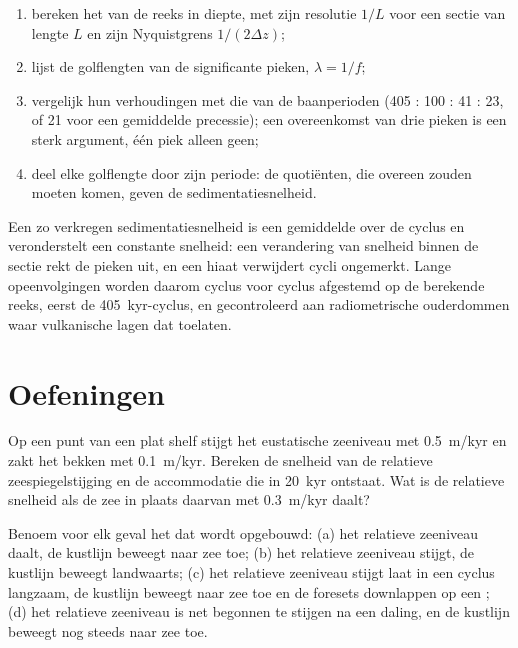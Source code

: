 \begin{method}\label{met:b3:sequence-stratigraphy:cycles}
\begin{enumerate}
\item bereken het  van de reeks in diepte, met zijn resolutie
  $1/L$ voor een sectie van lengte $L$ en zijn Nyquistgrens $1/(2\Delta z)$;
\item lijst de golflengten van de significante pieken, $\lambda = 1/f$;
\item vergelijk hun verhoudingen met die van de baanperioden (405 : 100 : 41
  : 23, of 21 voor een gemiddelde precessie); een overeenkomst van drie pieken is een sterk
  argument, één piek alleen geen;
\item deel elke golflengte door zijn periode: de quotiënten, die overeen zouden moeten komen,
  geven de sedimentatiesnelheid.
\end{enumerate}
\end{method}

Een zo verkregen sedimentatiesnelheid is een gemiddelde over de cyclus en
veronderstelt een constante snelheid: een verandering van snelheid binnen de sectie rekt de
pieken uit, en een hiaat verwijdert cycli ongemerkt. Lange opeenvolgingen worden daarom
cyclus voor cyclus afgestemd op de berekende reeks, eerst de \qty{405}{kyr}-cyclus,
en gecontroleerd aan radiometrische ouderdommen waar vulkanische lagen dat toelaten.

\section{Oefeningen}

\begin{exercise}[$\star$]\label{exo:b3:sequence-stratigraphy:1}
Op een punt van een plat shelf stijgt het eustatische zeeniveau met \qty{0.5}{m/kyr} en
zakt het bekken met \qty{0.1}{m/kyr}. Bereken de snelheid van de relatieve
zeespiegelstijging en de accommodatie die in \qty{20}{kyr} ontstaat. Wat is de relatieve
snelheid als de zee in plaats daarvan met \qty{0.3}{m/kyr} daalt?
\end{exercise}

\begin{exercise}[$\star$]\label{exo:b3:sequence-stratigraphy:2}
Benoem voor elk geval het  dat wordt opgebouwd: (a) het relatieve zeeniveau
daalt, de kustlijn beweegt naar zee toe; (b) het relatieve zeeniveau stijgt, de
kustlijn beweegt landwaarts; (c) het relatieve zeeniveau stijgt laat in een
cyclus langzaam, de kustlijn beweegt naar zee toe en de foresets downlappen op een
; (d) het relatieve zeeniveau is net begonnen te stijgen na een
daling, en de kustlijn beweegt nog steeds naar zee toe.
\end{exercise}

